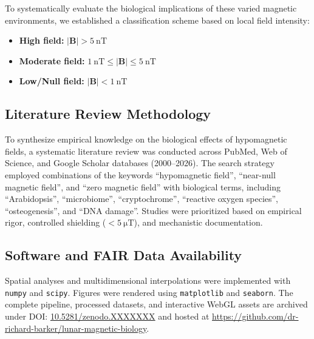 To systematically evaluate the biological implications of these varied magnetic environments, we established a classification scheme based on local field intensity:
\begin{itemize}
    \item \textbf{High field:} $|\mathbf{B}| > \SI{5}{\nano\tesla}$
    \item \textbf{Moderate field:} $\SI{1}{\nano\tesla} \le |\mathbf{B}| \le \SI{5}{\nano\tesla}$
    \item \textbf{Low/Null field:} $|\mathbf{B}| < \SI{1}{\nano\tesla}$
\end{itemize}

\subsection{Literature Review Methodology}
To synthesize empirical knowledge on the biological effects of hypomagnetic fields, a systematic literature review was conducted across PubMed, Web of Science, and Google Scholar databases (2000--2026). The search strategy employed combinations of the keywords ``hypomagnetic field'', ``near-null magnetic field'', and ``zero magnetic field'' with biological terms, including ``Arabidopsis'', ``microbiome'', ``cryptochrome'', ``reactive oxygen species'', ``osteogenesis'', and ``DNA damage''. Studies were prioritized based on empirical rigor, controlled shielding ($< \SI{5}{\micro\tesla}$), and mechanistic documentation.

\subsection{Software and FAIR Data Availability}
Spatial analyses and multidimensional interpolations were implemented with \texttt{numpy} and \texttt{scipy}. Figures were rendered using \texttt{matplotlib} and \texttt{seaborn}. The complete pipeline, processed datasets, and interactive WebGL assets are archived under DOI: \href{https://doi.org/10.5281/zenodo.XXXXXXX}{10.5281/zenodo.XXXXXXX} and hosted at \url{https://github.com/dr-richard-barker/lunar-magnetic-biology}.
